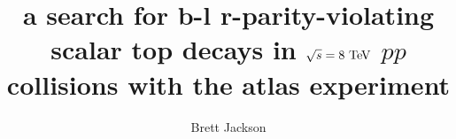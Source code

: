 \title{a search for b-l r-parity-violating scalar top decays
  in $\sqrt{s} = 8 \TeV$ $pp$ collisions with the atlas experiment}
    
\author{Brett Jackson}

\newcommand{\adviser}{Evelyn Thomson, Associate Professor, Physics}
\newcommand{\advisershort}{Evelyn Thomson}

\newcommand{\myinstitution}{The University of Pennsylvania}

\newcommand{\chairperson}{Marija Drndic, Professor, Physics}

\newcommand{\committeeOne}
    {Gary Bernstein, Professor, Physics}
\newcommand{\committeeTwo}
    {I. Joseph Kroll, Professor, Physics}
\newcommand{\committeeThree}
    {Burt Ovrut, Professor, Physics}
\newcommand{\committeeFour}
    {H.H. Williams, Professor, Physics}



